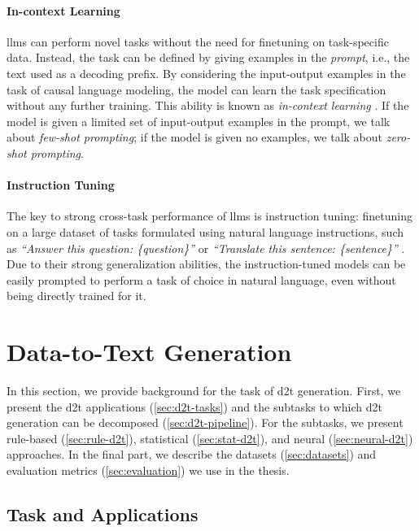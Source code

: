 {\paragraph{In-context Learning} \acp{llm} can perform novel tasks without the need for finetuning on task-specific data. Instead, the task can be defined by giving examples in the \emph{prompt}, i.e., the text used as a decoding prefix. By considering the input-output examples in the task of causal language modeling, the model can learn the task specification without any further training. This ability is known as \emph{in-context learning} \cite{brown2020language,dong2022survey}. If the model is given a limited set of input-output examples in the prompt, we talk about \emph{few-shot prompting}; if the model is given no examples, we talk about \emph{zero-shot prompting}.

\paragraph{Instruction Tuning} The key to strong cross-task performance of \acp{llm} is instruction tuning: finetuning on a large dataset of tasks formulated using natural language instructions, such as \textit{``Answer this question: \{question\}''} or \textit{``Translate this sentence: \{sentence\}''} \cite{sanh2021multitask,ouyang2022TrainingLM}. Due to their strong generalization abilities, the instruction-tuned models can be easily prompted to perform a task of choice in natural language, even without being directly trained for it.



\section{Data-to-Text Generation}
\label{sec:d2t}
In this section, we provide background for the task of \ac{d2t} generation. First, we present the \ac{d2t} applications (\autoref{sec:d2t-tasks}) and the subtasks to which \ac{d2t} generation can be decomposed (\autoref{sec:d2t-pipeline}). For the subtasks, we present rule-based (\autoref{sec:rule-d2t}), statistical (\autoref{sec:stat-d2t}), and neural (\autoref{sec:neural-d2t}) approaches. In the final part, we describe the datasets (\autoref{sec:datasets}) and evaluation metrics (\autoref{sec:evaluation}) we use in the thesis.

\subsection{Task and Applications}
\label{sec:d2t-tasks}

}
